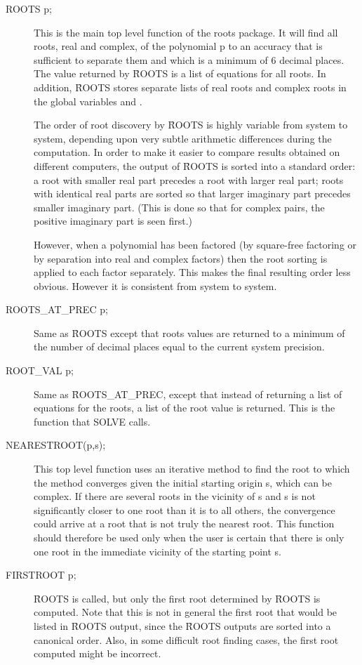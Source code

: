 \begin{description}
\item[ROOTS p;] This is the main top level function of the roots package.
It will find all roots, real and complex, of the polynomial p to an
accuracy that is sufficient to separate them and which is a minimum of 6
decimal places.  The value returned by \f{ROOTS} is a
list of equations for all roots.  In addition, \f{ROOTS} stores separate lists
of real roots and complex roots in the global variables  and
.  

The order of root discovery by \f{ROOTS} is highly variable from system to
system, depending upon very subtle arithmetic differences during the
computation.  In order to make it easier to compare results obtained on
different computers, the output of \f{ROOTS} is sorted into a standard order:
a root with smaller real part precedes a root with larger real part; roots
with identical real parts are sorted so that larger imaginary part
precedes smaller imaginary part. (This is done so that for complex pairs,
the positive imaginary part is seen first.)

However, when a polynomial has been factored (by square-free factoring or
by separation into real and complex factors) then the root sorting is
applied to each factor separately.  This makes the final resulting order
less obvious.  However it is consistent from system to system.

\item[ROOTS\_AT\_PREC p;] Same as \f{ROOTS} except that roots values are
returned to a minimum of the number of decimal places equal to the current
system precision.

\item[ROOT\_VAL p;] Same as \f{ROOTS\_AT\_PREC}, except that instead of
returning a list of equations for the roots, a list of the root value is
returned.  This is the function that SOLVE calls.

\item[NEARESTROOT(p,s);] This top level function uses an iterative method
to find the root to which the method converges given the initial starting
origin s, which can be complex.  If there are several roots in the
vicinity of s and s is not significantly closer to one root than it is to
all others, the convergence could arrive at a root that is not truly the
nearest root.  This function should therefore be used only when the user
is certain that there is only one root in the immediate vicinity of the
starting point s.

\item[FIRSTROOT p;] \f{ROOTS} is called, but only the first root determined by
\f{ROOTS} is computed.  Note that this is not in general the first root that
would be listed in \f{ROOTS} output, since the \f{ROOTS} outputs are sorted into
a canonical order.  Also, in some difficult root finding cases, the first
root computed might be incorrect.
\end{description}


